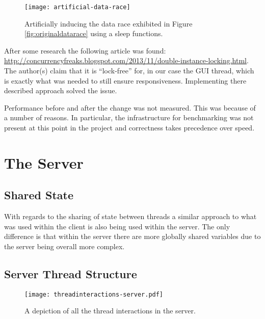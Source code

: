 \documentclass[article]{uom-coursework}
\begin{document}
\begin{figure}[H]
\centering
\texttt{[image: artificial-data-race]}
\caption{Artificially inducing the data race exhibited in Figure
\ref{fig:originaldatarace} using a sleep functions.}
\label{fig:artificialdatarace}
\end{figure}

After some research the following article was found:
\url{http://concurrencyfreaks.blogspot.com/2013/11/double-instance-locking.html}.
The author(s) claim that it is ``lock-free'' for, in our case
the GUI thread, which is exactly what was needed to still ensure
responsiveness. Implementing there described approach solved the
issue.

\begin{marker}
    Performance before and after the change was not measured.
    This was because of a number of reasons. In particular, the
    infrastructure for benchmarking was not present at this
    point in the project and correctness takes precedence over
    speed.
\end{marker}

\section{The Server}

\subsection{Shared State}

With regards to the sharing of state between threads a similar
approach to what was used within the client is also being used
within the server. The only difference is that within the server
there are more globally shared variables due to the server being
overall more complex.

\subsection{Server Thread Structure}

\begin{figure}[H]
\centering
\begin{mdframed}[backgroundcolor=OffWhite]
\texttt{[image: threadinteractions-server.pdf]}
\end{mdframed}
\caption{A depiction of all the thread interactions in the
server.}
\label{fig:serverthreads}
\end{figure}
\end{document}
